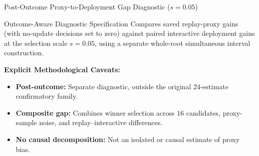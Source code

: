 \documentclass[10pt,aspectratio=169]{beamer}
\begin{document}
\begin{frame}{Post-Outcome Proxy-to-Deployment Gap Diagnostic ($s=0.05$)}
  \footnotesize
  \begin{block}{Outcome-Aware Diagnostic Specification}
    Compares saved replay-proxy gains (with no-update decisions set to zero) against paired interactive deployment gains at the selection scale $s=0.05$, using a separate whole-root simultaneous interval construction.
  \end{block}

  \vspace{0.3em}
  \centering

  \vspace{0.25em}
  \raggedright
  \textbf{Explicit Methodological Caveats:}
  \begin{itemize}\itemsep0.15em\parskip0pt
    \item \textbf{Post-outcome:} Separate diagnostic, outside the original $24$-estimate confirmatory family.
    \item \textbf{Composite gap:} Combines winner selection across $16$ candidates, proxy-sample noise, and replay--interactive differences.
    \item \textbf{No causal decomposition:} Not an isolated or causal estimate of proxy bias.
  \end{itemize}
\end{frame}
\end{document}
